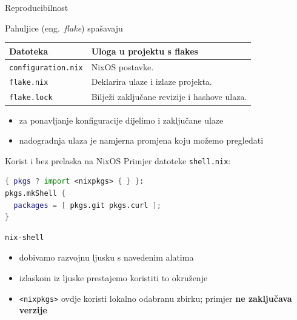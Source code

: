 \documentclass{beamer}
\begin{document}
\begin{frame}{Reproducibilnost}
\end{frame}

\begin{frame}{Pahuljice (eng.\ \textit{flake}) spašavaju}
	\vskip25pt
	{\small
		\renewcommand{\arraystretch}{1.3}
		\begin{tabular}{@{}l >{\raggedright\arraybackslash}p{7.5cm}@{}}
			\toprule
			\textbf{Datoteka}          & \textbf{Uloga u projektu s flakes}           \\
			\midrule
			\texttt{configuration.nix} & NixOS postavke.                              \\
			\texttt{flake.nix}         & Deklarira ulaze i izlaze projekta.           \\
			\texttt{flake.lock}        & Bilježi zaključane revizije i hashove ulaza. \\
			\bottomrule
		\end{tabular}}

	\vspace{0.3em}
	\vskip10pt
	\begin{itemize}
		\item za ponavljanje konfiguracije dijelimo i zaključane ulaze
		\item nadogradnja ulaza je namjerna promjena koju možemo pregledati
	\end{itemize}
\end{frame}

\begin{frame}[fragile]{Korist i bez prelaska na NixOS}
	Primjer datoteke \texttt{shell.nix}:
	\begin{lstlisting}[language=nix]
{ pkgs ? import <nixpkgs> { } }:
pkgs.mkShell {
  packages = [ pkgs.git pkgs.curl ];
}
\end{lstlisting}

	\begin{lstlisting}
nix-shell
\end{lstlisting}

	\begin{itemize}
		\item dobivamo razvojnu ljusku s navedenim alatima
		\item izlaskom iz ljuske prestajemo koristiti to okruženje
		\item \texttt{<nixpkgs>} ovdje koristi lokalno odabranu zbirku; primjer \textbf{ne zaključava verzije}
	\end{itemize}
\end{frame}
\end{document}
